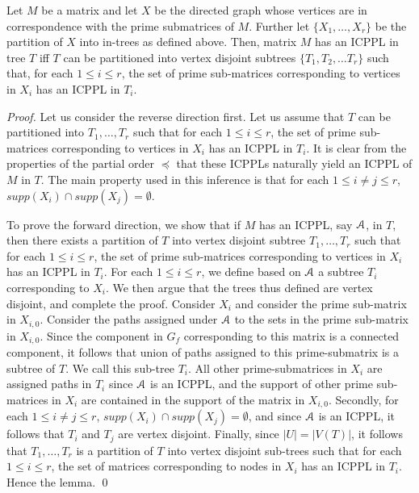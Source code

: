 \documentclass[a4paper,UKenglish,numberwithinsect]{lipics}
\def\cA{{\cal A}}
\begin{document}
\begin{lemma}
\label{lem:subicppa}
Let $M$ be a matrix and let $X$ be the directed graph whose vertices
are in correspondence with the prime submatrices of $M$.  Further let
$\{X_1,\ldots,X_r\}$ be the partition of $X$ into in-trees as defined
above. 
Then, matrix $M$ has an ICPPL in tree $T$ iff $T$ can be partitioned
into vertex disjoint subtrees 
 $\{T_1, T_2, \dots T_r\}$ such that, for each $1 \leq i \leq r$, the
 set of prime sub-matrices corresponding to vertices in $X_i$ has an
 ICPPL in $T_i$. 
\end{lemma}
\begin{proof}
Let us consider the reverse direction first.  Let us assume that $T$
can be partitioned into $T_1, \ldots, T_r$ such 
that for each $1 \leq i \leq r $, the set of prime sub-matrices
corresponding to vertices in $X_i$ has an ICPPL in $T_i$.  It is clear
from the properties of the partial order $\preccurlyeq$ that these
ICPPLs naturally yield an ICPPL  of $M$ in $T$.  The main property
used in this inference is that for each $1 \leq i \neq j \leq r$,
$supp(X_i) \cap supp(X_j) = \emptyset$.   

\noindent
To prove the forward direction, we show that if $M$ has an ICPPL, say
$\cA$, in $T$, then there exists 
  a partition of $T$ into vertex disjoint subtree $T_1, \ldots, T_r$
  such that for each $1 \leq i \leq r$, the set of prime sub-matrices
  corresponding to vertices in $X_i$ has an ICPPL in $T_i$.  For each
  $1 \leq i \leq r$, we define based on $\cA$ a subtree  
$T_i$ corresponding to $X_i$.  We then argue that the trees thus
defined are vertex disjoint, and complete the proof. 
 Consider $X_i$ and consider the prime sub-matrix in $X_{i,0}$.
 Consider the paths assigned under $\cA$ to the sets in the prime
 sub-matrix in $X_{i,0}$.  Since the component in $G_f$ corresponding
 to this matrix is a connected component, it follows that union of
 paths assigned to this prime-submatrix is a subtree of $T$.  We call
 this sub-tree $T_i$.  All other prime-submatrices in $X_i$ are
 assigned paths in $T_i$ since $\cA$ is an ICPPL, and the support of
 other prime sub-matrices in $X_i$ are contained in the support of the
 matrix in $X_{i,0}$.  Secondly, for each $1 \leq i \neq j \leq r$,
 $supp(X_i) \cap supp(X_j) = \emptyset$, and since $\cA$ is an ICPPL, it
 follows that $T_i$ and $T_j$ are vertex disjoint.  Finally, since
 $|U| = |V(T)|$, it follows that $T_1, \ldots, T_r$ is a partition of
 $T$ into vertex disjoint sub-trees such that for each $1 \leq i \leq
 r$, the set of matrices corresponding to nodes in $X_i$ has an ICPPL
 in $T_i$.  Hence the lemma. 
\qed
\end{proof}
\end{document}
